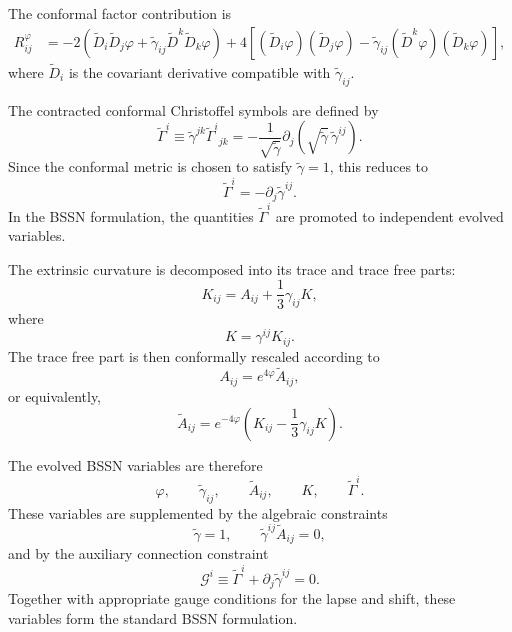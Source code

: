 The conformal factor contribution is
\begin{equation}
\begin{aligned}
R^{\varphi}_{ij}
&=
-2
\left(
\tilde{D}_i\tilde{D}_j\varphi
+
\tilde{\gamma}_{ij}\tilde{D}^k\tilde{D}_k\varphi
\right)
+
4
\left[
\left(\tilde{D}_i\varphi\right)
\left(\tilde{D}_j\varphi\right)
-
\tilde{\gamma}_{ij}
\left(\tilde{D}^k\varphi\right)
\left(\tilde{D}_k\varphi\right)
\right],
\end{aligned}
\end{equation}
where $\tilde{D}_i$ is the covariant derivative compatible with $\tilde{\gamma}_{ij}$.

The contracted conformal Christoffel symbols are defined by
\begin{equation}
\tilde{\Gamma}^{i}
\equiv
\tilde{\gamma}^{jk}\tilde{\Gamma}^{i}{}_{jk}
=
-\frac{1}{\sqrt{\tilde{\gamma}}}
\partial_j
\left(
\sqrt{\tilde{\gamma}}\,
\tilde{\gamma}^{ij}
\right).
\end{equation}
Since the conformal metric is chosen to satisfy $\tilde{\gamma}=1$, this reduces to
\begin{equation}
\tilde{\Gamma}^{i}
=
-\partial_j\tilde{\gamma}^{ij}.
\end{equation}
In the BSSN formulation, the quantities $\tilde{\Gamma}^i$ are promoted to independent evolved variables.

The extrinsic curvature is decomposed into its trace and trace free parts:
\begin{equation}
K_{ij}
=
A_{ij}
+
\frac{1}{3}\gamma_{ij}K,
\end{equation}
where
\begin{equation}
K
=
\gamma^{ij}K_{ij}.
\end{equation}
The trace free part is then conformally rescaled according to
\begin{equation}
A_{ij}
=
e^{4\varphi}\tilde{A}_{ij},
\end{equation}
or equivalently,
\begin{equation}
\tilde{A}_{ij}
=
e^{-4\varphi}
\left(
K_{ij}
-
\frac{1}{3}\gamma_{ij}K
\right).
\end{equation}

The evolved BSSN variables are therefore
\begin{equation}
\varphi,\qquad
\tilde{\gamma}_{ij},\qquad
\tilde{A}_{ij},\qquad
K,\qquad
\tilde{\Gamma}^i .
\end{equation}
These variables are supplemented by the algebraic constraints
\begin{equation}
\tilde{\gamma}=1,
\qquad
\tilde{\gamma}^{ij}\tilde{A}_{ij}=0,
\end{equation}
and by the auxiliary connection constraint
\begin{equation}
\mathcal{G}^i
\equiv
\tilde{\Gamma}^i
+
\partial_j\tilde{\gamma}^{ij}
=
0 .
\end{equation}
Together with appropriate gauge conditions for the lapse and shift, these variables form the standard BSSN formulation.

